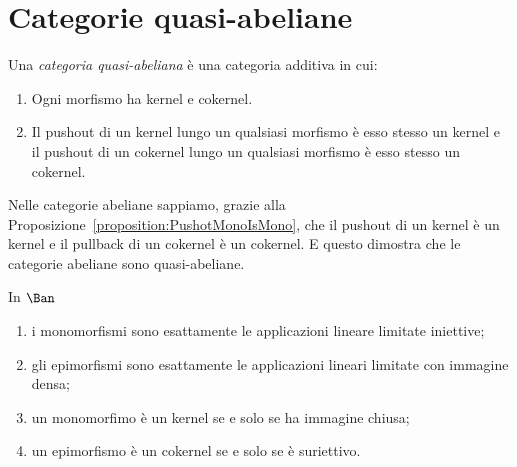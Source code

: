 \section{Categorie quasi-abeliane}

\begin{definition}
  Una {\em categoria quasi-abeliana} è una categoria additiva in cui:
  \begin{enumerate}[leftmargin=*]
  \item Ogni morfismo ha kernel e cokernel.
  \item Il pushout di un kernel lungo un qualsiasi morfismo è esso
    stesso un kernel e il pushout di un cokernel lungo un qualsiasi
    morfismo è esso stesso un cokernel.
  \end{enumerate}
\end{definition}

Nelle categorie abeliane sappiamo, grazie alla
Proposizione~\ref{proposition:PushotMonoIsMono}, che il pushout di un
kernel è un kernel e il pullback di un cokernel è un cokernel. E questo
dimostra che le categorie abeliane sono quasi-abeliane.

\begin{remark}
  In \(\Ban\)
  \begin{enumerate}
  \item i monomorfismi sono esattamente le applicazioni lineare limitate
    iniettive;
  \item gli epimorfismi sono esattamente le applicazioni lineari
    limitate con immagine densa;
  \item un monomorfimo è un kernel se e solo se ha immagine chiusa;
  \item un epimorfismo è un cokernel se e solo se è suriettivo.
  \end{enumerate}
\end{remark}

